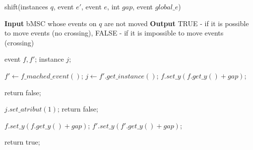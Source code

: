 \documentclass{article}
\begin{document}
\begin{algorithm}
\caption{shift(instances $q$, event $e'$, event $e$, int $gap$, event $global\_e$)}
\begin{algorithmic}[1]

\STATE \textbf{Input} bMSC whose events on $q$ are not moved
\STATE \textbf{Output} TRUE - if it is possible to move events (no crossing), FALSE - if it is impossible to move events (crossing)
\STATE

\STATE event $f, f'$;
\STATE instance $j$;
\STATE

\STATE {}
\STATE $f' \leftarrow f\_mached\_event()$;
\STATE $j \leftarrow f'.get\_instance()$; 
\STATE {}
\STATE $f.set\_y(f.get\_y() + gap)$;
\ELSE

\STATE return false;
\ENDIF
\ENDFOR
\STATE

\STATE $j.set\_atribut(1)$;
\STATE return false;
\ENDIF
\ENDIF

\STATE $f.set\_y(f.get\_y() + gap)$;
\STATE $f'.set\_y(f'.get\_y() + gap)$;

\ENDIF

\ENDFOR

\STATE return true;

\end{algorithmic}
\end{algorithm}
\end{document}
